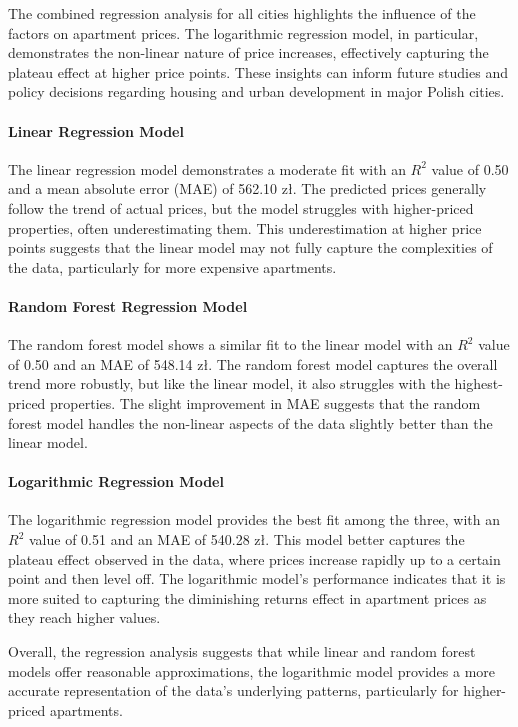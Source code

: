 The combined regression analysis for all cities highlights the influence of the factors on apartment prices. The logarithmic regression model, in particular, demonstrates the non-linear nature of price increases, effectively capturing the plateau effect at higher price points. These insights can inform future studies and policy decisions regarding housing and urban development in major Polish cities.

\paragraph{Linear Regression Model}
The linear regression model demonstrates a moderate fit with an \( R^2 \) value of 0.50 and a mean absolute error (MAE) of 562.10 zł. The predicted prices generally follow the trend of actual prices, but the model struggles with higher-priced properties, often underestimating them. This underestimation at higher price points suggests that the linear model may not fully capture the complexities of the data, particularly for more expensive apartments.

\paragraph{Random Forest Regression Model}
The random forest model shows a similar fit to the linear model with an \( R^2 \) value of 0.50 and an MAE of 548.14 zł. The random forest model captures the overall trend more robustly, but like the linear model, it also struggles with the highest-priced properties. The slight improvement in MAE suggests that the random forest model handles the non-linear aspects of the data slightly better than the linear model.

\paragraph{Logarithmic Regression Model}
The logarithmic regression model provides the best fit among the three, with an \( R^2 \) value of 0.51 and an MAE of 540.28 zł. This model better captures the plateau effect observed in the data, where prices increase rapidly up to a certain point and then level off. The logarithmic model's performance indicates that it is more suited to capturing the diminishing returns effect in apartment prices as they reach higher values.

Overall, the regression analysis suggests that while linear and random forest models offer reasonable approximations, the logarithmic model provides a more accurate representation of the data's underlying patterns, particularly for higher-priced apartments.

